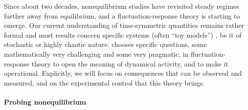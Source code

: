 Since about two decades, nonequilibrium studies have revisited steady regimes further away
from equilibrium, and a fluctuation-response theory is starting to emerge. Our current
understanding of time-symmetric quantities remains rather formal and most results concern
specific systems (often ``toy models'') , be it of stochastic or highly chaotic nature.
%
\TheProject chooses specific questions, some mathematically very challenging and some very
pragmatic, in fluctuation-response theory to open the meaning of dynamical activity, and to
make it operational.
%
Explicitly, we will focus on consequences that can be observed and measured, and on the
experimental control that this theory brings.

\paragraph{Probing nonequilibrium}

